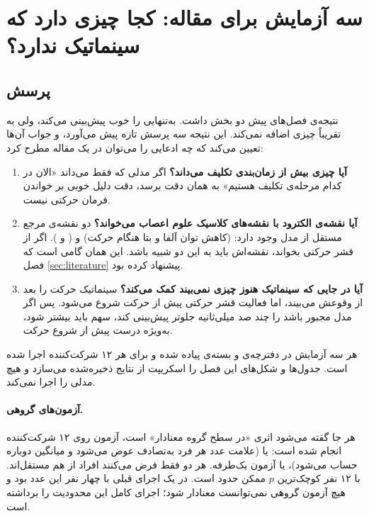 \FloatBarrier
\section{سه آزمایش برای مقاله:  کجا چیزی دارد که سینماتیک ندارد؟}
\label{sec:controls}

\subsection{پرسش}

نتیجه‌ی فصل‌های پیش دو بخش داشت.  به‌تنهایی  را خوب پیش‌بینی می‌کند، ولی به  تقریباً چیزی اضافه نمی‌کند. این نتیجه سه پرسش تازه پیش می‌آورد، و جواب آن‌ها تعیین می‌کند که چه ادعایی را می‌توان در یک مقاله مطرح کرد:
\begin{enumerate}
\item \textbf{آیا  چیزی بیش از زمان‌بندی تکلیف می‌داند؟} اگر مدلی که فقط می‌داند «الان در کدام مرحله‌ی تکلیف هستیم» به همان دقت  برسد، دقت  دلیل خوبی بر خواندن فرمان حرکتی نیست.
\item \textbf{آیا نقشه‌ی الکترود  با نقشه‌های کلاسیک علوم اعصاب می‌خواند؟} دو نقشه‌ی مرجع مستقل از مدل وجود دارد:  (کاهش توان آلفا و بتا هنگام حرکت) و  (  و ). اگر  از قشر حرکتی بخواند، نقشه‌اش باید به این دو شبیه باشد. این همان گامی است که فصل \ref{sec:literature} پیشنهاد کرده بود.
\item \textbf{آیا  در جایی که سینماتیک هنوز چیزی نمی‌بیند کمک می‌کند؟} سینماتیک حرکت را بعد از وقوعش می‌بیند، اما فعالیت قشر حرکتی پیش از حرکت شروع می‌شود. پس اگر مدل مجبور باشد  را چند صد میلی‌ثانیه جلوتر پیش‌بینی کند، سهم  باید بیشتر شود، به‌ویژه درست پیش از شروع حرکت.
\end{enumerate}

هر سه آزمایش در دفترچه‌ی  و بسته‌ی  پیاده شده و برای هر ۱۲ شرکت‌کننده اجرا شده است. جدول‌ها و شکل‌های این فصل را اسکریپت  از نتایج ذخیره‌شده می‌سازد و هیچ مدلی را اجرا نمی‌کند.

\paragraph{آزمون‌های گروهی.} هر جا گفته می‌شود اثری «در سطح گروه معنادار» است، آزمون روی ۱۲ شرکت‌کننده انجام شده است: یا  (علامت عدد هر فرد به‌تصادف عوض می‌شود و میانگین دوباره حساب می‌شود)، یا آزمون  یک‌طرفه. هر دو فقط فرض می‌کنند افراد از هم مستقل‌اند. با ۱۲ نفر کوچک‌ترین $p$ ممکن حدود  است. در یک اجرای قبلی با چهار نفر این عدد  بود و هیچ آزمون گروهی نمی‌توانست معنادار شود؛ اجرای کامل این محدودیت را برداشته است.

